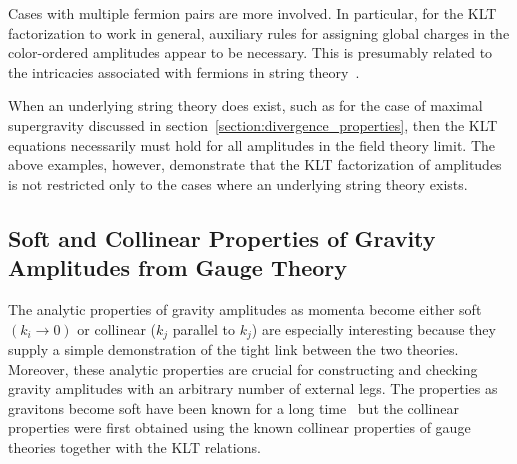 \documentclass[12pt]{livrev}
\begin{document}
Cases with multiple fermion pairs are more involved. In particular,
for the KLT factorization to work in general, auxiliary rules for
assigning global charges in the color-ordered amplitudes appear to be
necessary.  This is presumably related to the intricacies associated
with fermions in string theory~\cite{Friedan}.

When an underlying string theory does exist, such as for the case of
maximal supergravity discussed in
section~\ref{section:divergence_properties}, then the KLT equations
necessarily must hold for all amplitudes in the field theory limit.
The above examples, however, demonstrate that the KLT factorization of
amplitudes is not restricted only to the cases where an underlying string
theory exists.


\subsection{Soft and Collinear Properties of Gravity Amplitudes 
from Gauge Theory}
\label{subsection:soft_collinear}

The analytic properties of gravity amplitudes as momenta become either
soft $ (k_i \rightarrow 0)$ or collinear ($k_j$ parallel to $k_j$) are
especially interesting because they supply a simple demonstration of
the tight link between the two theories.  Moreover, these analytic
properties are crucial for constructing and checking gravity
amplitudes with an arbitrary number of external legs.  The properties
as gravitons become soft have been known for a long
time~\cite{WeinbergSoftG,BGK} but the collinear properties were first
obtained using the known collinear properties of gauge theories together
with the KLT relations.
\end{document}
